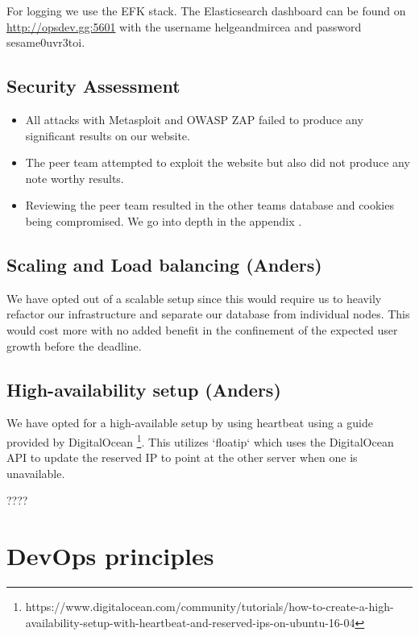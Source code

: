 \documentclass{article}
\begin{document}
For logging we use the EFK stack. The Elasticsearch dashboard can be found on \url{http://opsdev.gg:5601} with the username helgeandmircea and password sesame0uvr3toi.

\subsection{Security Assessment}

\begin{itemize}
    \item All attacks with Metasploit and OWASP ZAP failed to produce any significant results on our website. 
    \item The peer team  attempted to exploit the website but also did not produce any note worthy results. 
    \item Reviewing the peer team resulted in the other teams database and cookies being compromised. We go into depth in the appendix \label{appendix:security assessment}.

\end{itemize}


 

\subsection{Scaling and Load balancing (Anders)}

We have opted out of a scalable setup since this would require us to heavily refactor our infrastructure and separate our database from individual nodes. This would cost more with no added benefit in the confinement of the expected user growth before the deadline.  

\subsection{High-availability setup (Anders)}

We have opted for a high-available setup by using heartbeat using a guide provided by DigitalOcean \footnote{https://www.digitalocean.com/community/tutorials/how-to-create-a-high-availability-setup-with-heartbeat-and-reserved-ips-on-ubuntu-16-04}. This utilizes `floatip` which uses the DigitalOcean API to update the reserved IP to point at the other server when one is unavailable. 

????


\section{DevOps principles}
\end{document}
